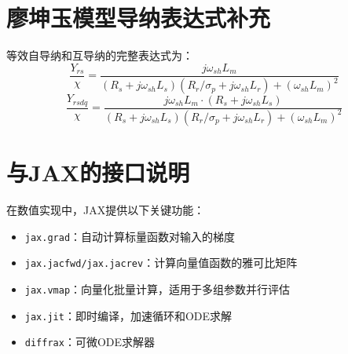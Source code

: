 \documentclass[withoutpreface,bwprint]{cumcmthesis}
\begin{document}
\begin{appendices}
\section{廖坤玉模型导纳表达式补充}
等效自导纳和互导纳的完整表达式为：
\begin{equation}
\frac{Y_{rs}}{\chi} = \frac{j\omega_{sh}L_m}{(R_s+j\omega_{sh}L_s)(R_r/\sigma_p+j\omega_{sh}L_r)+(\omega_{sh}L_m)^2}
\end{equation}
\begin{equation}
\frac{Y_{rsdq}}{\chi} = \frac{j\omega_{sh}L_m\cdot(R_s+j\omega_{sh}L_s)}{(R_s+j\omega_{sh}L_s)(R_r/\sigma_p+j\omega_{sh}L_r)+(\omega_{sh}L_m)^2}
\end{equation}

\section{与JAX的接口说明}
在数值实现中，JAX提供以下关键功能：
\begin{itemize}
\item \verb|jax.grad|：自动计算标量函数对输入的梯度
\item \verb|jax.jacfwd/jax.jacrev|：计算向量值函数的雅可比矩阵
\item \verb|jax.vmap|：向量化批量计算，适用于多组参数并行评估
\item \verb|jax.jit|：即时编译，加速循环和ODE求解
\item \verb|diffrax|：可微ODE求解器
\end{itemize}


\end{appendices}
\end{document}
